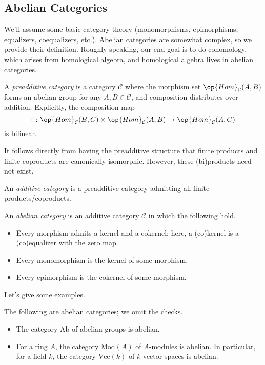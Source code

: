 \documentclass[../notes.tex]{subfiles}
\begin{document}
\subsection{Abelian Categories}
We'll assume some basic category theory (monomorphisms, epimorphisms, equalizers, coequalizers, etc.). Abelian categories are somewhat complex, so we provide their definition. Roughly speaking, our end goal is to do cohomology, which arises from homological algebra, and homological algebra lives in abelian categories.
\begin{definition}[preadditive]
	A \textit{preadditive category} is a category $\mathcal C$ where the morphism set $\op{Hom}_\mathcal C(A,B)$ forms an abelian group for any $A,B\in\mathcal C$, and composition distributes over addition. Explicitly, the composition map
	\[\circ\colon\op{Hom}_\mathcal C(B,C)\times\op{Hom}_\mathcal C(A,B)\to\op{Hom}_\mathcal C(A,C)\]
	is bilinear.
\end{definition}
It follows directly from having the preadditive structure that finite products and finite coproducts are canonically isomorphic. However, these (bi)products need not exist.
\begin{definition}[additive]
	An \textit{additive category} is a preadditive category admitting all finite products/coproducts.
\end{definition}
\begin{definition}[abelian]
	An \textit{abelian category} is an additive category $\mathcal C$ in which the following hold.
	\begin{itemize}
		\item Every morphism admits a kernel and a cokernel; here, a (co)kernel is a (co)equalizer with the zero map.
		\item Every monomorphism is the kernel of some morphism.
		\item Every epimorphism is the cokernel of some morphism.
	\end{itemize}
\end{definition}
Let's give some examples.
\begin{example}
	The following are abelian categories; we omit the checks.
	\begin{itemize}
		\item The category $\mathrm{Ab}$ of abelian groups is abelian.
		\item For a ring $A$, the category $\mathrm{Mod}(A)$ of $A$-modules is abelian. In particular, for a field $k$, the category $\mathrm{Vec}(k)$ of $k$-vector spaces is abelian.
	\end{itemize}
\end{example}
\end{document}
